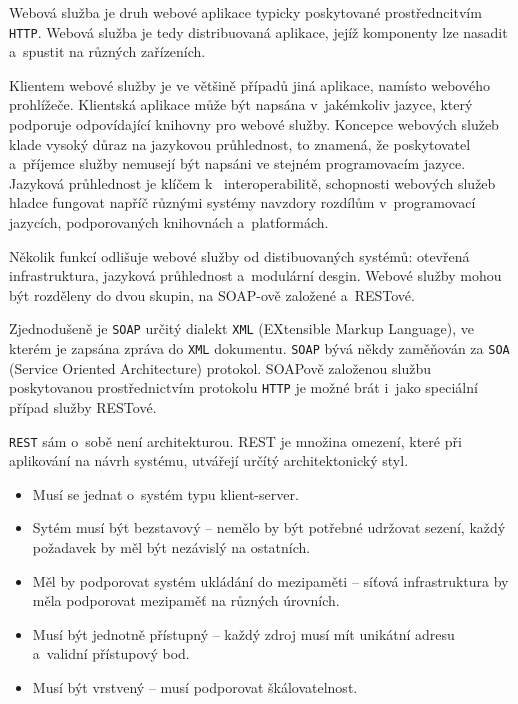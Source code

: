 \documentclass[twoside, 12pt]{article}
\begin{document}
{

Webová služba je druh webové aplikace typicky poskytované prostředncitvím \texttt{HTTP}. \cite{kalin}
Webová služba je tedy distribuovaná aplikace, jejíž komponenty lze nasadit a~spustit na různých zařízeních.

Klientem webové služby je ve většině případů jiná aplikace, namísto webového prohlížeče.
Klientská aplikace může být napsána v~jakémkoliv jazyce, který podporuje
odpovídající knihovny pro webové služby.
Koncepce webových služeb klade vysoký důraz na jazykovou průhlednost,
to znamená, že poskytovatel a~příjemce služby nemusejí být napsáni
ve stejném programovacím jazyce.
Jazyková průhlednost je klíčem k~ interoperabilitě,
schopnosti webových služeb hladce fungovat napříč různými systémy navzdory rozdílům v~programovací jazycích,
podporovaných knihovnách a~platformách.

Několik funkcí odlišuje webové služby od distibuovaných systémů: otevřená infrastruktura,
jazyková průhlednost a~modulární desgin.
Webové služby mohou být rozděleny do dvou skupin, na SOAP-ově založené a~RESTové.


Zjednodušeně je \texttt{SOAP} určitý dialekt \texttt{XML}
(EXtensible Markup Language), ve kterém je zapsána zpráva do \texttt{XML} dokumentu.
\texttt{SOAP} bývá někdy zaměňován za \texttt{SOA} (Service Oriented Architecture) protokol.
SOAPově založenou službu poskytovanou prostřednictvím protokolu \texttt{HTTP}
je možné brát i~jako speciální případ služby RESTové.
\cite{kalin}


\texttt{REST} sám o~sobě není architekturou. REST je množina omezení,
které při aplikování na návrh systému, utvářejí určítý architektonický styl.
\cite{sandoval}

\bigskip

\begin{itemize}
\item Musí se jednat o~systém typu klient-server.
\item Sytém musí být bezstavový -- nemělo by být potřebné udržovat sezení, každý požadavek by měl být nezávislý na ostatních.
\item Měl by podporovat systém ukládání do mezipaměti -- síťová infrastruktura by měla podporovat mezipaměť na různých úrovních.
\item Musí být jednotně přístupný -- každý zdroj musí mít unikátní adresu a~validní přístupový bod.
\item Musí být vrstvený -- musí podporovat škálovatelnost.
\end{itemize}

}
\end{document}
